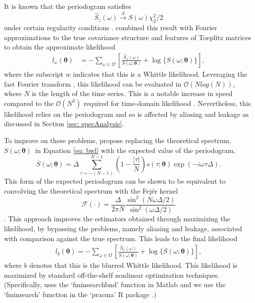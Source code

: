 \documentclass{stat572Style}
\begin{document}
 It is known that  the periodogram satisfies
\begin{equation}
\hat{S}_{z}(\omega) \overset{d}{\rightarrow} S(\omega) \chi^{2}_{2}/2
\end{equation}
under certain regularity conditions \citep{Contreras2006}. 
\citet{Whittle1953} combined this result with Fourier approximations to the true covariance structure and features of Toeplitz matrices to obtain the approximate likelihood
\begin{align}
\label{eq: bwl}
l_{\omega}(\boldsymbol{\theta}) 
&= -\sum_{\omega \in \Omega} \left[ \frac{\hat{S}_{z}(\omega)}{S(\omega;\boldsymbol{\theta})}  + \log  \{ S(\omega; \boldsymbol{\theta}) \}\right],
\end{align}
where the subscript $w$ indicates that this is a Whittle likelihood. 
Leveraging the fast Fourier transform \citep{Cooley1965}, this  likelihood can be evaluated in $\mathcal{O}(N log(N))$, where $N$ is the length of the time series. 
This is a notable increase in speed compared to the $\mathcal{O}(N^{3})$  required for time-domain likelihood  \citep{Sykulski2016}. 
  Nevertheless, this likelihood relies on the periodogram and so is affected by aliasing and leakage as discussed in Section \ref{sec: specAnalysis}. 
 
To improve on these problems, \citet{Sykulski2013} propose replacing the theoretical spectrum, $S(\omega; \boldsymbol{\theta})$\, in Equation \eqref{eq: bwl} with the expected value of the periodogram, 
\begin{equation}
\overline{S}(\omega; \boldsymbol{\theta}) = \Delta \sum_{\tau = - (N - 1)}^{N-1} \left(1 - \frac{|\tau|}{N} \right)s(\tau ; \boldsymbol{\theta}) \exp ( - i \omega \tau \Delta).
\end{equation} 
This form of the expected periodogram can be shown to be equivalent to convolving the theoretical spectrum with the Fej\'{e}r kernel 
\begin{equation}
\mathcal{F}(\cdot) = \frac{\Delta}{2\pi N} \frac{\sin^{2}(N \omega \Delta/2)}{\sin^{2}(\omega \Delta /2)} 
\end{equation} \citep{Sykulski2013}. 
This approach improves the estimators obtained through maximizing the likelihood, by bypassing the problems, namely aliasing and leakage,  associated with comparison against the true spectrum. 
This leads to the final likelihood
\begin{align}
l_{b}(\boldsymbol{\theta}) = - \sum_{\omega \in \Omega} \left[\frac{\hat{S}_{z}(\omega)}{\overline{S}(\omega; \boldsymbol{\theta})} + \log \{ \overline{S} (\omega; \boldsymbol{\theta}) \}\right],
\end{align}
where $b$ denotes that this is the blurred Whittle likelihood. This likelihood is maximized by standard off-the-shelf nonlinear optimization techniques. (Specifically, \citet{Sykulski2016} uses the `fminsearchbnd' function in Matlab \citep{DErrico2006} and we use the `fminsearch' function in the `pracma' R package \citep{Borchers2015}.) 
\end{document}
